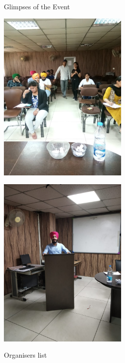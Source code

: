 \documentclass[12pt, a4 paper]{article}
\begin{document}
\begin{center}
\Huge Glimpses of the Event

\bigskip

\includegraphics[height=8.5cm]{image6.jpg}

\medskip

\includegraphics[height=8.5cm]{image5.jpg}

\end{center}

\newpage

\begin{center}
\huge Organisers list
\end{center}
\end{document}
